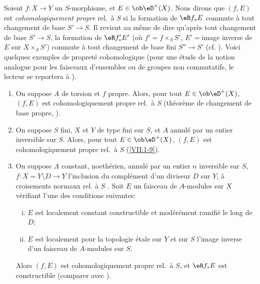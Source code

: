 Soient $f:X\to Y$ un $S$-morphisme, et $E\in\ob\eD^+(X)$. Nous dirons que 
$(f,E)$ est \emph{cohomologiquement propre} rel.\ à $S$ si la formation de 
$\eR f_\ast E$ commute à tout changement de base $S'\to S$. Il revient au 
même de dire qu'après tout changement de base $S'\to S$, la formation de 
$\eR f_\ast' E'$ (où $f'=f\times_S S'$, $E'=$image inverse de $E$ sur 
$X\times_S S'$) commute à tout changement de base fini $S'' \to S'$ (cf. 
\cite[XII 6.1]{sga4}). Voici quelques exemples de propreté cohomologique 
(pour une étude de la notion analogue pour les faisceaux d'ensembles ou de 
groupes non commutatifs, le lecteur se reportera à \cite[XIII]{sga1}). 
\begin{enumerate}[{1.3.}1.]
  \item On suppose $A$ de torsion et $f$ propre. Alors, pour tout 
    $E\in\ob\eD^+(X)$, $(f,E)$ est cohomologiquement propre rel.\ à $S$ 
    (théorème de changement de base propre, \cite[XII 5.1]{sga4}). 
  \item On suppose $S$ fini, $X$ et $Y$ de type fini sur $S$, et $A$ annulé 
    par un entier inversible sur $S$. Alors, pour tout $E\in\ob\eD^+(X)$, 
    $(f,E)$ est cohomologiquement propre rel.\ à $S$ 
    (\ref{VII:1-9}). 
  \item On suppose $A$ constant, noethérien, annulé par un entier $n$ 
    inversible sur $S$, $f:X=Y\setminus D\to Y$ l'inclusion du complément 
    d'un diviseur $D$ sur $Y$, à croisements normaux rel. à $S$ 
    \cite[XIII 2.1]{sga1}. Soit $E$ un faisceau de $A$-modules sur $X$ 
    vérifiant l'une des conditions suivantes: 
    \begin{enumerate}[(i)]
      \item $E$ est localement constant constructible et modérément 
        ramifié le long de $D$; 
      \item $E$ est localement pour la topologie étale sur $Y$ et sur $S$ 
        l'image inverse d'un faisceau de $A$-modules sur $S$. 
    \end{enumerate}
    Alors $(f,E)$ est cohomologiquement propre rel.\ à $S$, et $\eR f_\ast E$ est 
    constructible (comparer avec \cite[XIII 2.4]{sga1}). 
\end{enumerate} 

